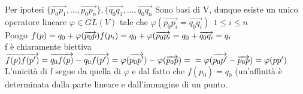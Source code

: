\documentclass[12px]{article}
\theoremstyle{break}
\theoremstyle{break}
\theoremstyle{break}
\theoremstyle{break}
\theoremstyle{break}
\newtheorem*{dimo}{Dimostrazione}
\theoremstyle{break}
\theoremstyle{break}
\newenvironment{dimo}
  {\begin{dimostrazione}}
  {\hfill\square\end{dimostrazione}}
\begin{document}
	\begin{dimo}
		Per ipotesi $\{\overrightarrow{p_0p_1},\ldots,\overrightarrow{p_0p_n}\},\{\overrightarrow{q_0q_1}, \ldots, \overrightarrow{q_0q_n}$ Sono basi di V, dunque esiste un unico operatore lineare $\varphi\in GL(V)$ tale che $\varphi(\overrightarrow{p_0p_i} = \overrightarrow{q_0q_i}) \ \ 1\leq i\leq n$ \\
			Pongo	$f(p) = q_0 + \varphi(\overrightarrow{p_0p})\\
			f(p_i) = q_0 + \varphi(\overrightarrow{p_0p_i} = q_0 + \overrightarrow{q_0q_i} = q_i$ \\ 
			f è chiaramente biettiva
			$\overrightarrow{f(p)f(p')} = \overrightarrow{q_0f(p)} - \overrightarrow{q_0f(p')} = \varphi(\overrightarrow{p_0p'}) - \varphi(\overrightarrow{p_0p}) = \\= \varphi(\overrightarrow{p_0p'} - \overrightarrow{p_0p}) = \varphi(pp')$ \\
			L'unicità di f segue da quella di $\varphi$ e dal fatto che $f(p_0) = q_0$ (un'affinità è determinata dalla parte lineare e dall'immagine di un punto.
	\end{dimo}
	\newpage
\end{document}
